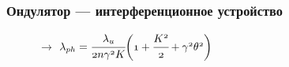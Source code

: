 \documentclass[14pt, hyperref = {colorlinks}]{beamer}
\begin{document}
\small
\begin{frame}
\frametitle{Ондулятор --- интерференционное устройство}\label{t1}
\begin{figure}[h]
		\hspace{10pt}$\longrightarrow$\hspace{10pt}
		{$\mathnormal{\lambda_{ph} = \cfrac{\lambda_{u}}{2n\gamma^2 K}\bigg(1 + \cfrac{K^2}{2} + \gamma^2\theta^2\bigg)}$}
\end{figure}
 \end{frame}
\end{document}
